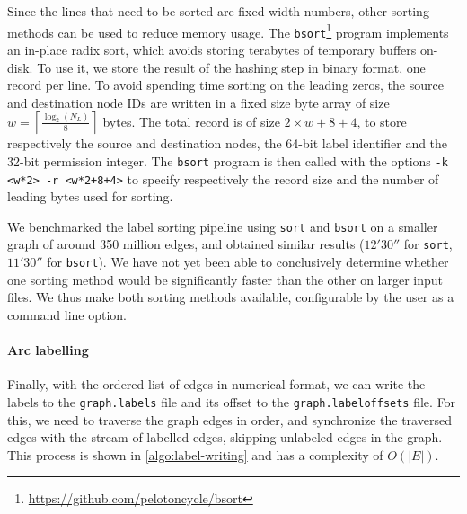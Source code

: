 Since the lines that need to be sorted are fixed-width numbers, other
sorting methods can be used to reduce memory usage. The
\texttt{bsort}\footnote{\url{https://github.com/pelotoncycle/bsort}} program
implements an in-place radix sort, which avoids storing terabytes of temporary
buffers on-disk. To use it, we store the result of the hashing step in binary
format, one record per line. To avoid spending time sorting on the leading
zeros, the source and destination node IDs are written in a fixed size byte
array of size $w = \left\lceil{\frac{\log_2(N_L)}{8}}\right\rceil$ bytes. The
total record is of size $2 \times w + 8 + 4$, to store respectively the source
and destination nodes, the 64-bit label identifier and the 32-bit permission
integer. The \texttt{bsort} program is then called with the options \texttt{-k
<w*2> -r <w*2+8+4>} to specify respectively the record size and the number of
leading bytes used for sorting.

We benchmarked the label sorting pipeline using \texttt{sort} and
\texttt{bsort} on a smaller graph of around 350 million edges, and obtained
similar results ($12'30''$ for \texttt{sort}, $11'30''$ for \texttt{bsort}).
We have not yet been able to conclusively determine whether one sorting method
would be significantly faster than the other on larger input files. We thus
make both sorting methods available, configurable by the user as a command line
option.

\paragraph{Arc labelling}
Finally, with the ordered list of edges in numerical format, we can write the
labels to the \texttt{graph.labels} file and its offset to the
\texttt{graph.labeloffsets} file. For this, we need to traverse the graph edges
in order, and synchronize the traversed edges with the stream of labelled
edges, skipping unlabeled edges in the graph. This process is shown in
\cref{algo:label-writing} and has a complexity of $O(|E|)$.

